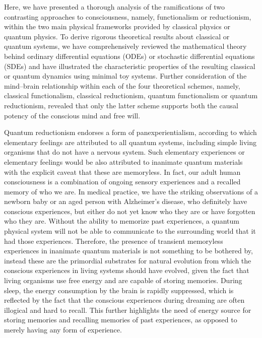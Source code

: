 \documentclass{ws-ijmpb}
\begin{document}
Here, we have presented a thorough analysis of the ramifications of two contrasting approaches to consciousness, namely, functionalism or reductionism, within the two main physical frameworks provided by classical physics or quantum physics.
To derive rigorous theoretical results about classical or quantum systems, we have comprehensively reviewed the mathematical theory behind ordinary differential equations (ODEs) or stochastic differential equations (SDEs) and have illustrated the characteristic properties of the resulting classical or quantum dynamics using minimal toy systems.
Further consideration of the mind--brain relationship within each of the four theoretical schemes, namely,
classical functionalism, classical reductionism, quantum functionalism
or quantum reductionism, revealed that only the latter scheme supports
both the causal potency of the conscious mind and free will.

Quantum reductionism endorses a form of panexperientialism, according to which elementary feelings are attributed to all quantum systems, including simple living organisms that do not have a nervous system. Such elementary experiences or elementary feelings would be also attributed to inanimate quantum materials with the explicit caveat that these are memoryless. In fact, our adult human consciousness is a combination of ongoing sensory experiences and a recalled memory of who we are. In medical practice, we have the striking observations of a newborn baby or an aged person with Alzheimer's disease, who definitely have conscious experiences, but either do not yet know who they are or have forgotten who they are. Without the ability to memorize past experiences, a quantum physical system will not be able to communicate to the surrounding world that it had those experiences. Therefore, the presence of transient memoryless experiences in inanimate quantum materials is not something to be bothered by, instead these are the primordial substrates for natural evolution from which the conscious experiences in living systems should have evolved, given the fact that living organisms use free energy and are capable of storing memories. During sleep, the energy consumption by the brain is rapidly suppressed, which is reflected by the fact that the conscious experiences during dreaming are often illogical and hard to recall. This further highlights the need of energy source for storing memories and recalling memories of past experiences, as opposed to merely having any form of experience.
\end{document}
